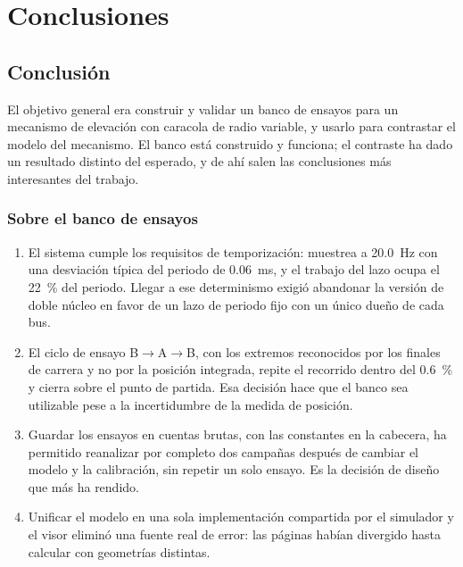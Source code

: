 \chapter{Conclusiones}
\label{chap:conclusiones}

\section{Conclusión}

El objetivo general era construir y validar un banco de ensayos para un mecanismo de elevación con
caracola de radio variable, y usarlo para contrastar el modelo del mecanismo. El banco está
construido y funciona; el contraste ha dado un resultado distinto del esperado, y de ahí salen las
conclusiones más interesantes del trabajo.

\subsection{Sobre el banco de ensayos}

\begin{enumerate}
  \item El sistema cumple los requisitos de temporización: muestrea a \SI{20.0}{\hertz} con una
        desviación típica del periodo de \SI{0.06}{\milli\second}, y el trabajo del lazo ocupa el
        \SI{22}{\percent} del periodo. Llegar a ese determinismo exigió abandonar la versión de doble
        núcleo en favor de un lazo de periodo fijo con un único dueño de cada bus.
  \item El ciclo de ensayo B$\rightarrow$A$\rightarrow$B, con los extremos reconocidos por los
        finales de carrera y no por la posición integrada, repite el recorrido dentro del
        \SI{0.6}{\percent} y cierra sobre el punto de partida. Esa decisión hace que el banco sea
        utilizable pese a la incertidumbre de la medida de posición.
  \item Guardar los ensayos en cuentas brutas, con las constantes en la cabecera, ha permitido
        reanalizar por completo dos campañas después de cambiar el modelo y la calibración, sin
        repetir un solo ensayo. Es la decisión de diseño que más ha rendido.
  \item Unificar el modelo en una sola implementación compartida por el simulador y el visor
        eliminó una fuente real de error: las páginas habían divergido hasta calcular con
        geometrías distintas.
\end{enumerate}

